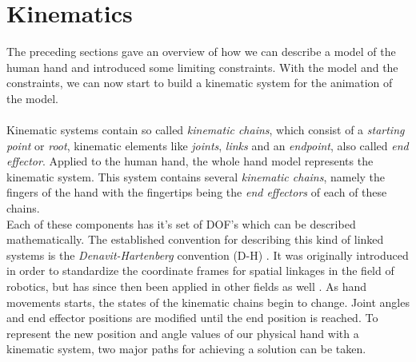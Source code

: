 \section{Kinematics}
\label{sec:kinematics}
The preceding sections gave an overview of how we can describe a model of the human hand and introduced some limiting constraints. With the model and the constraints, we can now start to build a kinematic system for the animation of the model.\\\\
Kinematic systems contain so called \textit{kinematic chains}, which consist of a \textit{starting point} or \textit{root}, kinematic elements like \textit{joints}, \textit{links} and an \textit{endpoint}, also called \textit{end effector}. Applied to the human hand, the whole hand model represents the kinematic system. This system contains several \textit{kinematic chains}, namely the fingers of the hand with the fingertips being the \textit{end effectors} of each of these chains.
\\Each of these components has it's set of DOF's which can be described mathematically. The established convention for describing this kind of linked systems is the \textit{Denavit-Hartenberg} convention (D-H) \cite{Denavit.1955}. It was originally introduced in order to standardize the coordinate frames for spatial linkages in the field of robotics, but has since then been applied in other fields as well \cite{Spong.2008}.  
As hand movements starts, the states of the kinematic chains begin to change. Joint angles and end effector positions are modified until the end position is reached. To represent the new position and angle values of our physical hand with a kinematic system, two major paths for achieving a solution can be taken.
